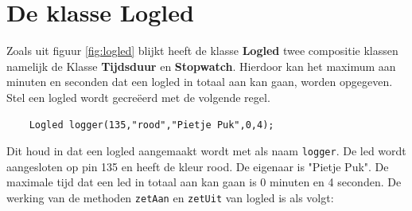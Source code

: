 

\section{De klasse Logled}

Zoals uit figuur \ref{fig:logled} blijkt heeft de klasse \textbf{Logled} twee compositie klassen namelijk de Klasse \textbf{Tijdsduur} en \textbf{Stopwatch}.
Hierdoor kan het maximum aan minuten en seconden dat een logled in totaal aan kan gaan, worden opgegeven. Stel een logled wordt gecreëerd met de volgende regel.
\begin{lstlisting}
	Logled logger(135,"rood","Pietje Puk",0,4);
\end{lstlisting}
Dit houd in dat een logled aangemaakt wordt met als naam \texttt{logger}. De led wordt aangesloten op pin 135 en heeft de kleur rood. De eigenaar is "Pietje Puk". De maximale tijd dat een led in totaal aan kan gaan is 0 minuten en 4 seconden.
De werking van de methoden \texttt{zetAan} en \texttt{zetUit} van logled is als volgt:

